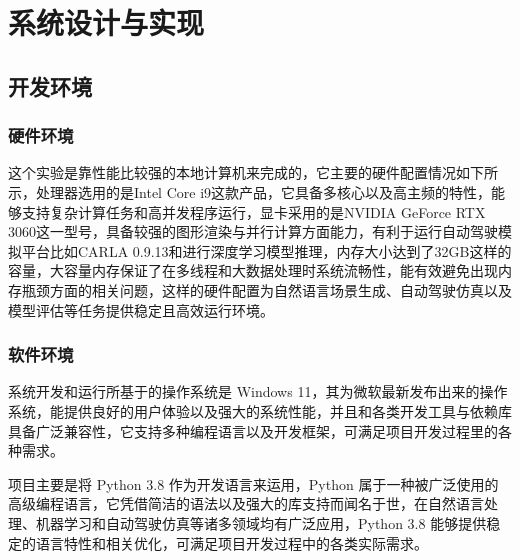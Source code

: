 
\chapter{系统设计与实现}
\section{开发环境}
\subsection{硬件环境}
这个实验是靠性能比较强的本地计算机来完成的，它主要的硬件配置情况如下所示，处理器选用的是Intel Core i9这款产品，它具备多核心以及高主频的特性，能够支持复杂计算任务和高并发程序运行，显卡采用的是NVIDIA GeForce RTX 3060这一型号，具备较强的图形渲染与并行计算方面能力，有利于运行自动驾驶模拟平台比如CARLA 0.9.13和进行深度学习模型推理，内存大小达到了32GB这样的容量，大容量内存保证了在多线程和大数据处理时系统流畅性，能有效避免出现内存瓶颈方面的相关问题，这样的硬件配置为自然语言场景生成、自动驾驶仿真以及模型评估等任务提供稳定且高效运行环境。
\subsection{软件环境}
系统开发和运行所基于的操作系统是 Windows 11，其为微软最新发布出来的操作系统，能提供良好的用户体验以及强大的系统性能，并且和各类开发工具与依赖库具备广泛兼容性，它支持多种编程语言以及开发框架，可满足项目开发过程里的各种需求。

项目主要是将 Python 3.8 作为开发语言来运用，Python 属于一种被广泛使用的高级编程语言，它凭借简洁的语法以及强大的库支持而闻名于世，在自然语言处理、机器学习和自动驾驶仿真等诸多领域均有广泛应用，Python 3.8 能够提供稳定的语言特性和相关优化，可满足项目开发过程中的各类实际需求。


